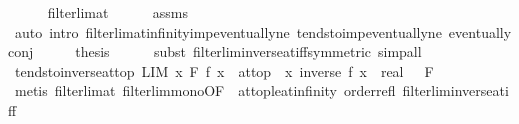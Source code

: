 \begin{isabellebody}
\ \ \ \ \isamarkupfalse%
\ filterlim{\isacharunderscore}{\kern0pt}at\isanewline
\ \ \ \ \isamarkupfalse%
\ assms\isanewline
\ \ \ \ \isamarkupfalse%
\ {\isacharparenleft}{\kern0pt}auto\ intro{\isacharcolon}{\kern0pt}\ filterlim{\isacharunderscore}{\kern0pt}at{\isacharunderscore}{\kern0pt}infinity{\isacharunderscore}{\kern0pt}imp{\isacharunderscore}{\kern0pt}eventually{\isacharunderscore}{\kern0pt}ne\ tendsto{\isacharunderscore}{\kern0pt}imp{\isacharunderscore}{\kern0pt}eventually{\isacharunderscore}{\kern0pt}ne\ eventually{\isacharunderscore}{\kern0pt}conj{\isacharparenright}{\kern0pt}\isanewline
\ \ \isamarkupfalse%
\ \isamarkupfalse%
\ {\isacharquery}{\kern0pt}thesis\isanewline
\ \ \ \ \isamarkupfalse%
\ {\isacharparenleft}{\kern0pt}subst\ filterlim{\isacharunderscore}{\kern0pt}inverse{\isacharunderscore}{\kern0pt}at{\isacharunderscore}{\kern0pt}iff{\isacharbrackleft}{\kern0pt}symmetric{\isacharbrackright}{\kern0pt}{\isacharparenright}{\kern0pt}\ simp{\isacharunderscore}{\kern0pt}all\isanewline
{}\isamarkupfalse%
%
\endisatagproof
{\isafoldproof}%
%
\isadelimproof
\isanewline
%
\endisadelimproof
\isanewline
{}\isamarkupfalse%
\ tendsto{\isacharunderscore}{\kern0pt}inverse{\isacharunderscore}{\kern0pt}{}{\isacharunderscore}{\kern0pt}at{\isacharunderscore}{\kern0pt}top{\isacharcolon}{\kern0pt}\ {\isachardoublequoteopen}LIM\ x\ F{\isachardot}{\kern0pt}\ f\ x\ {\isacharcolon}{\kern0pt}{\isachargreater}{\kern0pt}\ at{\isacharunderscore}{\kern0pt}top\ {\isasymLongrightarrow}\ {\isacharparenleft}{\kern0pt}{\isacharparenleft}{\kern0pt}{\isasymlambda}x{\isachardot}{\kern0pt}\ inverse\ {\isacharparenleft}{\kern0pt}f\ x{\isacharparenright}{\kern0pt}\ {\isacharcolon}{\kern0pt}{\isacharcolon}{\kern0pt}\ real{\isacharparenright}{\kern0pt}\ {\isasymlonglongrightarrow}\ {}{\isacharparenright}{\kern0pt}\ F{\isachardoublequoteclose}\isanewline
%
\isadelimproof
\ \ %
\endisadelimproof
%
\isatagproof
{}\isamarkupfalse%
\ {\isacharparenleft}{\kern0pt}metis\ filterlim{\isacharunderscore}{\kern0pt}at\ filterlim{\isacharunderscore}{\kern0pt}mono{\isacharbrackleft}{\kern0pt}OF\ {\isacharunderscore}{\kern0pt}\ at{\isacharunderscore}{\kern0pt}top{\isacharunderscore}{\kern0pt}le{\isacharunderscore}{\kern0pt}at{\isacharunderscore}{\kern0pt}infinity\ order{\isacharunderscore}{\kern0pt}refl{\isacharbrackright}{\kern0pt}\ filterlim{\isacharunderscore}{\kern0pt}inverse{\isacharunderscore}{\kern0pt}at{\isacharunderscore}{\kern0pt}iff{\isacharparenright}{\kern0pt}%

\end{isabellebody}
